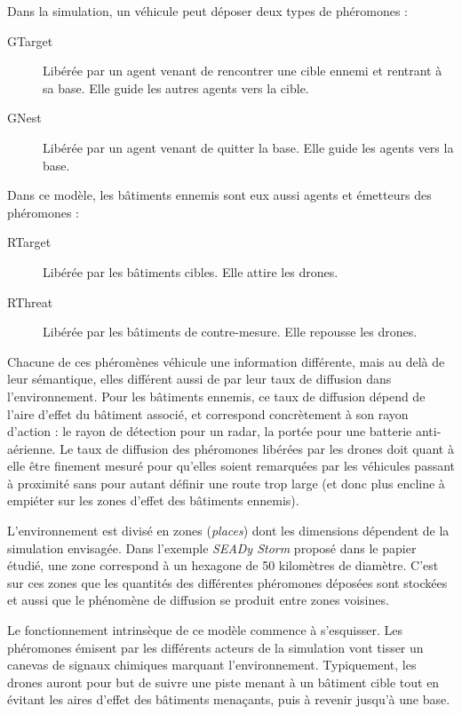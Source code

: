 \documentclass[12pt]{article}
\begin{document}
Dans la simulation, un véhicule peut déposer deux types de phéromones
:

\begin{description}
\item[GTarget]{Libérée par un agent venant de rencontrer une cible
  ennemi et rentrant à sa base. Elle guide les autres agents vers la
  cible.}
\item[GNest]{Libérée par un agent venant de quitter la base. Elle
  guide les agents vers la base.}
\end{description}

Dans ce modèle, les bâtiments ennemis sont eux aussi agents et
émetteurs des phéromones :

\begin{description}
\item[RTarget]{Libérée par les bâtiments cibles. Elle attire les
  drones.}
\item[RThreat]{Libérée par les bâtiments de contre-mesure. Elle
  repousse les drones.}
\end{description}

Chacune de ces phéromènes véhicule une information différente, mais au
delà de leur sémantique, elles différent aussi de par leur taux de
diffusion dans l'environnement.  Pour les bâtiments ennemis, ce taux
de diffusion dépend de l'aire d'effet du bâtiment associé, et
correspond concrètement à son rayon d'action : le rayon de détection
pour un radar, la portée pour une batterie anti-aérienne.  Le taux de
diffusion des phéromones libérées par les drones doit quant à elle
être finement mesuré pour qu'elles soient remarquées par les véhicules
passant à proximité sans pour autant définir une route trop large (et
donc plus encline à empiéter sur les zones d'effet des bâtiments
ennemis).

L'environnement est divisé en zones (\textit{places}) dont les
dimensions dépendent de la simulation envisagée.  Dans l'exemple
\textit{SEADy Storm} proposé dans le papier étudié, une zone
correspond à un hexagone de 50 kilomètres de diamètre. C'est sur ces
zones que les quantités des différentes phéromones déposées sont
stockées et aussi que le phénomène de diffusion se produit entre zones
voisines.

Le fonctionnement intrinsèque de ce modèle commence à s'esquisser. Les
phéromones émisent par les différents acteurs de la simulation vont
tisser un canevas de signaux chimiques marquant l'environnement.
Typiquement, les drones auront pour but de suivre une piste menant à
un bâtiment cible tout en évitant les aires d'effet des bâtiments
menaçants, puis à revenir jusqu'à une base.
\end{document}
